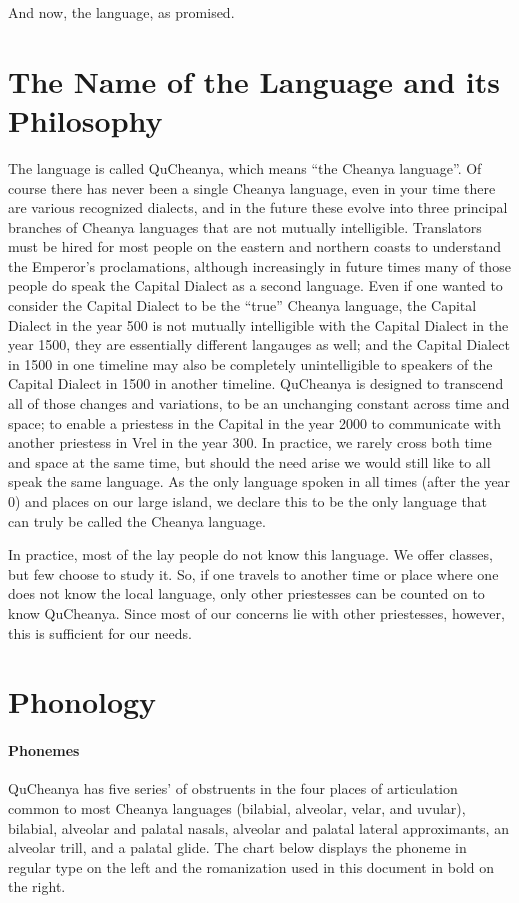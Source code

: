 \documentclass{article}
\begin{document}
And now, the language, as promised.

\newpage

\part{The Name of the Language and its Philosophy}

The language is called QuCheanya, which means ``the Cheanya language''.  Of course there has never been a single Cheanya language, even in your time there are various recognized dialects, and in the future these evolve into three principal branches of Cheanya languages that are not mutually intelligible.  Translators must be hired for most people on the eastern and northern coasts to understand the Emperor's proclamations, although increasingly in future times many of those people do speak the Capital Dialect as a second language.  Even if one wanted to consider the Capital Dialect to be the ``true'' Cheanya language, the Capital Dialect in the year 500 is not mutually intelligible with the Capital Dialect in the year 1500, they are essentially different langauges as well; and the Capital Dialect in 1500 in one timeline may also be completely unintelligible to speakers of the Capital Dialect in 1500 in another timeline. QuCheanya is designed to transcend all of those changes and variations, to be an unchanging constant across time and space; to enable a priestess in the Capital in the year 2000 to communicate with another priestess in Vrel in the year 300. In practice, we rarely cross both time and space at the same time, but should the need arise we would still like to all speak the same language. As the only language spoken in all times (after the year 0) and places on our large island, we declare this to be the only language that can truly be called the Cheanya language.

In practice, most of the lay people do not know this language. We offer classes, but few choose to study it. So, if one travels to another time or place where one does not know the local language, only other priestesses can be counted on to know QuCheanya. Since most of our concerns lie with other priestesses, however, this is sufficient for our needs.

\newpage

\part{Phonology}
\subsection{Phonemes}
QuCheanya has five series' of obstruents in the four places of articulation common to most Cheanya languages (bilabial, alveolar, velar, and uvular), bilabial, alveolar and palatal nasals, alveolar and palatal lateral approximants, an alveolar trill, and a palatal glide.  The chart below displays the phoneme in regular type on the left and the romanization used in this document in bold on the right.
\end{document}
